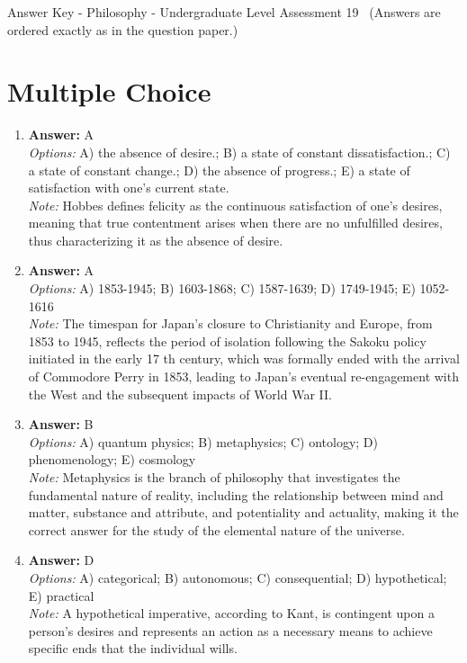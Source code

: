 \documentclass[12pt]{article}
\begin{document}
\begin{center}
Answer Key - Philosophy - Undergraduate Level Assessment 19 \
\small (Answers are ordered exactly as in the question paper.)
\end{center}

\section*{Multiple Choice}
\begin{enumerate}[label=\arabic*.]
\item \textbf{Answer:} A
\\ \textit{Options:} A) the absence of desire.; B) a state of constant dissatisfaction.; C) a state of constant change.; D) the absence of progress.; E) a state of satisfaction with one's current state.
\\ \textit{Note:} Hobbes defines felicity as the continuous satisfaction of one's desires, meaning that true contentment arises when there are no unfulfilled desires, thus characterizing it as the absence of desire.
\item \textbf{Answer:} A
\\ \textit{Options:} A) 1853-1945; B) 1603-1868; C) 1587-1639; D) 1749-1945; E) 1052-1616
\\ \textit{Note:} The timespan for Japan's closure to Christianity and Europe, from 1853 to 1945, reflects the period of isolation following the Sakoku policy initiated in the early 17 th century, which was formally ended with the arrival of Commodore Perry in 1853, leading to Japan's eventual re-engagement with the West and the subsequent impacts of World War II.
\item \textbf{Answer:} B
\\ \textit{Options:} A) quantum physics; B) metaphysics; C) ontology; D) phenomenology; E) cosmology
\\ \textit{Note:} Metaphysics is the branch of philosophy that investigates the fundamental nature of reality, including the relationship between mind and matter, substance and attribute, and potentiality and actuality, making it the correct answer for the study of the elemental nature of the universe.
\item \textbf{Answer:} D
\\ \textit{Options:} A) categorical; B) autonomous; C) consequential; D) hypothetical; E) practical
\\ \textit{Note:} A hypothetical imperative, according to Kant, is contingent upon a person's desires and represents an action as a necessary means to achieve specific ends that the individual wills.

\end{enumerate}
\end{document}
